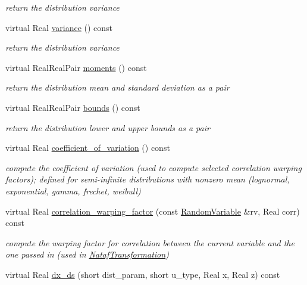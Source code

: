 \begin{DoxyCompactItemize}
\begin{DoxyCompactList}\small\item\em return the distribution variance \end{DoxyCompactList}\item 
virtual Real \hyperlink{classPecos_1_1RandomVariable_a4b8b05b2a9af92dad9cc304c2925a4eb}{variance} () const \label{classPecos_1_1RandomVariable_a4b8b05b2a9af92dad9cc304c2925a4eb}

\begin{DoxyCompactList}\small\item\em return the distribution variance \end{DoxyCompactList}\item 
virtual Real\+Real\+Pair \hyperlink{classPecos_1_1RandomVariable_a80e9024c98c6105a5eace8601a91b3d3}{moments} () const 
\begin{DoxyCompactList}\small\item\em return the distribution mean and standard deviation as a pair \end{DoxyCompactList}\item 
virtual Real\+Real\+Pair \hyperlink{classPecos_1_1RandomVariable_a4bdb95a8fa5fffaa0de5102f56963cf2}{bounds} () const \label{classPecos_1_1RandomVariable_a4bdb95a8fa5fffaa0de5102f56963cf2}

\begin{DoxyCompactList}\small\item\em return the distribution lower and upper bounds as a pair \end{DoxyCompactList}\item 
virtual Real \hyperlink{classPecos_1_1RandomVariable_ae1cf1c07047d7ad9dbb899aa01138d54}{coefficient\+\_\+of\+\_\+variation} () const 
\begin{DoxyCompactList}\small\item\em compute the coefficient of variation (used to compute selected correlation warping factors); defined for semi-\/infinite distributions with nonzero mean (lognormal, exponential, gamma, frechet, weibull) \end{DoxyCompactList}\item 
virtual Real \hyperlink{classPecos_1_1RandomVariable_a9ee48b3ca93459136b2e73f77873c4aa}{correlation\+\_\+warping\+\_\+factor} (const \hyperlink{classPecos_1_1RandomVariable}{Random\+Variable} \&rv, Real corr) const \label{classPecos_1_1RandomVariable_a9ee48b3ca93459136b2e73f77873c4aa}

\begin{DoxyCompactList}\small\item\em compute the warping factor for correlation between the current variable and the one passed in (used in \hyperlink{classPecos_1_1NatafTransformation}{Nataf\+Transformation}) \end{DoxyCompactList}\item 
virtual Real \hyperlink{classPecos_1_1RandomVariable_af889af8adfb262c9b74f573b2a9ffc99}{dx\+\_\+ds} (short dist\+\_\+param, short u\+\_\+type, Real x, Real z) const \label{classPecos_1_1RandomVariable_af889af8adfb262c9b74f573b2a9ffc99}


\end{DoxyCompactItemize}
